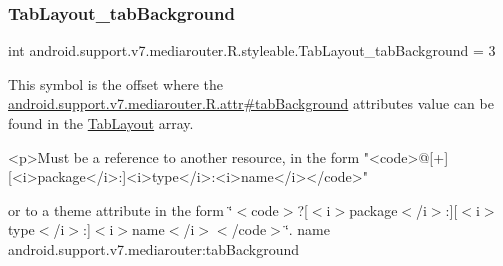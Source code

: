 \mbox{\label{classandroid_1_1support_1_1v7_1_1mediarouter_1_1R_1_1styleable_aacd8a2a688f5c215b79c9aec91e5e8ea}} 
\subsubsection{\texorpdfstring{Tab\+Layout\+\_\+tab\+Background}{TabLayout\_tabBackground}}
{\footnotesize\ttfamily int android.\+support.\+v7.\+mediarouter.\+R.\+styleable.\+Tab\+Layout\+\_\+tab\+Background = 3\hspace{0.3cm}{\ttfamily [static]}}

This symbol is the offset where the \hyperlink{classandroid_1_1support_1_1v7_1_1mediarouter_1_1R_1_1attr_aeb75b51613a16cdb79557607930714a1}{android.\+support.\+v7.\+mediarouter.\+R.\+attr\#tab\+Background} attribute\textquotesingle{}s value can be found in the \hyperlink{classandroid_1_1support_1_1v7_1_1mediarouter_1_1R_1_1styleable_a94de1350e0a902b4a974d775f2f4f25e}{Tab\+Layout} array.

\begin{DoxyVerb}      <p>Must be a reference to another resource, in the form "<code>@[+][<i>package</i>:]<i>type</i>:<i>name</i></code>"
\end{DoxyVerb}
 or to a theme attribute in the form \char`\"{}$<$code$>$?\mbox{[}$<$i$>$package$<$/i$>$\+:\mbox{]}\mbox{[}$<$i$>$type$<$/i$>$\+:\mbox{]}$<$i$>$name$<$/i$>$$<$/code$>$\char`\"{}.  name android.\+support.\+v7.\+mediarouter\+:tab\+Background \mbox{\label{classandroid_1_1support_1_1v7_1_1mediarouter_1_1R_1_1styleable_abfa3bc115c4d49ec7257d81e604f3830}} 
